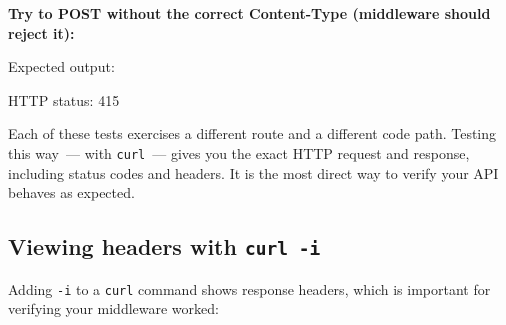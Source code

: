 \noindent{}\textbf{Try to POST without the correct Content-Type (middleware should reject it):}

\begin{codebox}[short]

\begin{Shaded}
\begin{Highlighting}[]
 \DataTypeTok{\textbackslash{}}
   
\end{Highlighting}
\end{Shaded}

\end{codebox}

\noindent{}Expected output:

\begin{codebox}[short]

\begin{Shaded}
\begin{Highlighting}[]
\FunctionTok{\{}\FunctionTok{:}\FunctionTok{\}}
\end{Highlighting}
\end{Shaded}

\end{codebox}

\noindent{}HTTP status: 415

Each of these tests exercises a different route and a different code path. Testing this way~--- with \texttt{curl}~--- gives you the exact HTTP request and response, including status codes and headers. It is the most direct way to verify your API behaves as expected.

\subsection*{\texorpdfstring{Viewing headers with \texttt{curl\ -i}}{Viewing headers with curl -i}}\label{04-request-handling-paths:viewing-headers-with-curl--i}

Adding \texttt{-i} to a \texttt{curl} command shows response headers, which is important for verifying your middleware worked:

\begin{codebox}[short]

\begin{Shaded}
\begin{Highlighting}[]
 
\end{Highlighting}
\end{Shaded}

\end{codebox}

